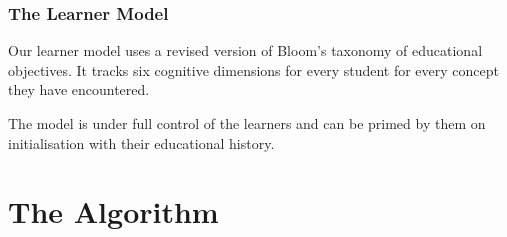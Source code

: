 \documentclass[aspectratio=169, usenames, dvipsnames]{beamer}
\begin{document}
\begin{frame}[fragile]
\frametitle{The Learner Model}
\begin{minipage}{0.4\textwidth}
Our learner model uses a revised version of Bloom's taxonomy of educational objectives. It tracks six cognitive dimensions for every student for every concept they have encountered.
\bigskip

The model is under full control of the learners and can be primed by them on initialisation with their educational history.
\end{minipage}%
\hfill
\begin{minipage}{0.55\textwidth}
\end{minipage}%
\end{frame}

\section{The Algorithm}
\end{document}
